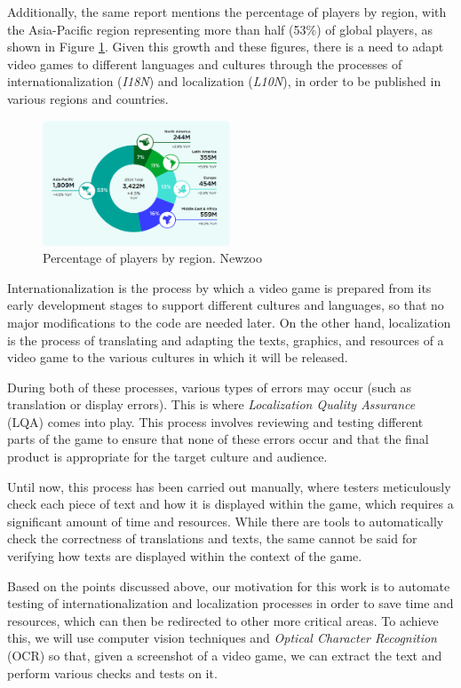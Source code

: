 Additionally, the same report mentions the percentage of players by region, with the Asia-Pacific region representing more than half (53\%) of global players, as shown in Figure \ref{fig:NewzooPlayersReg_E}.  
Given this growth and these figures, there is a need to adapt video games to different languages and cultures through the processes of internationalization ({\textit{I18N}}) and localization ({\textit{L10N}}), in order to be published in various regions and countries.

\begin{figure}[H]
	\centering
	\includegraphics[width = 0.5\textwidth]{Imagenes/Newzoo_Players_Region.png}
	\caption{Percentage of players by region. Newzoo}
	\label{fig:NewzooPlayersReg_E}
\end{figure}

Internationalization is the process by which a video game is prepared from its early development stages to support different cultures and languages, so that no major modifications to the code are needed later.  
On the other hand, localization is the process of translating and adapting the texts, graphics, and resources of a video game to the various cultures in which it will be released.

During both of these processes, various types of errors may occur (such as translation or display errors). This is where \textit{Localization Quality Assurance} (LQA) comes into play. This process involves reviewing and testing different parts of the game to ensure that none of these errors occur and that the final product is appropriate for the target culture and audience.

Until now, this process has been carried out manually, where testers meticulously check each piece of text and how it is displayed within the game, which requires a significant amount of time and resources. While there are tools to automatically check the correctness of translations and texts, the same cannot be said for verifying how texts are displayed within the context of the game.

Based on the points discussed above, our motivation for this work is to automate testing of internationalization and localization processes in order to save time and resources, which can then be redirected to other more critical areas.  
To achieve this, we will use computer vision techniques and \textit{Optical Character Recognition} (OCR) so that, given a screenshot of a video game, we can extract the text and perform various checks and tests on it.

